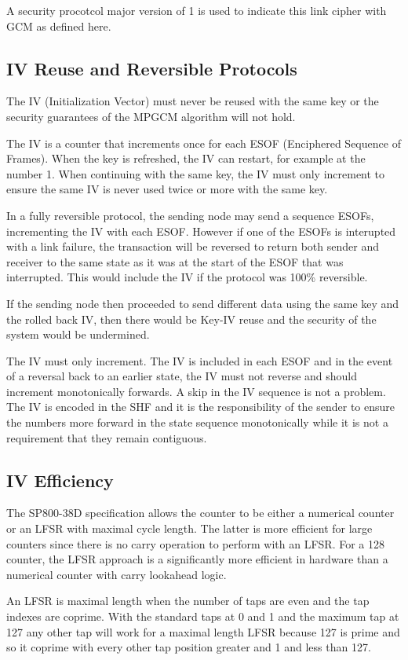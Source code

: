 \documentclass[../../../OAE-SPEC-MAIN.tex]{subfiles}
\begin{document}
A security procotcol major version of 1 is used to indicate this link cipher with GCM as defined here.

\subsection{IV Reuse and Reversible Protocols}
The IV (Initialization Vector) must never be reused with the same key or the security guarantees of the MPGCM algorithm will not hold.

The IV is a counter that increments once for each ESOF (Enciphered Sequence of Frames). When the key is refreshed, the IV can restart, for example at the number 1. When continuing with the same key, the IV must only increment to ensure the same IV is never used twice or more with the same key.

In a fully reversible protocol, the sending node may send a sequence ESOFs, incrementing the IV with each ESOF. However if one of the ESOFs is interupted with a link failure, the transaction will be reversed to return both sender and receiver to the same state as it was at the start of the ESOF that was interrupted. This would include the IV if the protocol was 100\% reversible.

If the sending node then proceeded to send different data using the same key and the rolled back IV, then there would be Key-IV reuse and the security of the system would be undermined.

The IV must only increment. The IV is included in each ESOF and in the event of a reversal back to an earlier state, the IV must not reverse and should increment monotonically forwards. A skip in the IV sequence is not a problem. The IV is encoded in the SHF and it is the responsibility of the sender to ensure the numbers more forward in the state sequence monotonically while it is not a requirement that they remain contiguous.

\subsection{IV Efficiency}
The SP800-38D specification allows the counter to be either a numerical counter or an LFSR with maximal cycle length. The latter is more efficient for large counters since there is no carry operation to perform with an LFSR. For a 128 counter, the LFSR approach is a significantly more efficient in hardware than a numerical counter with carry lookahead logic. 

An LFSR is maximal length when the number of taps are even and the tap indexes are coprime. With the standard taps at 0 and 1 and the maximum tap at 127 any other tap will work for a maximal length LFSR because 127 is prime and so it coprime with every other tap position greater and 1 and less than 127.
\end{document}
